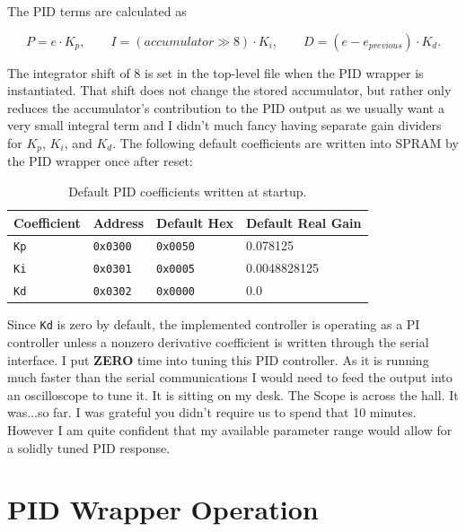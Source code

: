 \documentclass[12pt]{article}
\begin{document}
\noindent The PID terms are calculated as

\begin{equation}
  P = e \cdot K_p,
  \qquad
  I = (accumulator \gg 8) \cdot K_i,
  \qquad
  D = (e - e_{previous}) \cdot K_d.
\end{equation}

\noindent The integrator shift of 8 is set in the top-level file when the PID wrapper is instantiated. That shift does not change the stored accumulator, but rather only reduces the accumulator's contribution to the PID output as we usually want a very small integral term and I didn't much fancy having separate gain dividers for $K_p$, $K_i$, and $K_d$. The following default coefficients are written into SPRAM by the PID wrapper once after reset:

\begin{table}[H]
  \centering
  \caption{Default PID coefficients written at startup.}
  \label{tab:pid-gains}
  \begin{tabular}{llll}
    \toprule
    Coefficient & Address & Default Hex & Default Real Gain \\
    \midrule
    \texttt{Kp} & \texttt{0x0300} & \texttt{0x0050} & 0.078125 \\
    \texttt{Ki} & \texttt{0x0301} & \texttt{0x0005} & 0.0048828125 \\
    \texttt{Kd} & \texttt{0x0302} & \texttt{0x0000} & 0.0 \\
    \bottomrule
  \end{tabular}
\end{table}

\noindent Since \texttt{Kd} is zero by default, the implemented controller is operating as a PI controller unless a nonzero derivative coefficient is written through the serial interface.  I put \textbf{ZERO} time into tuning this PID controller.  As it is running much faster than the serial communications I would need to feed the output into an oscilloscope to tune it.  It is sitting on my desk.  The Scope is across the hall.  It was...so far.  I was grateful you didn't require us to spend that 10 minutes.  However I am quite confident that my available parameter range would allow for a solidly tuned PID response.  

\section*{PID Wrapper Operation}
\end{document}
